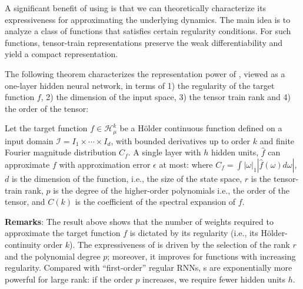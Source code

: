 %
A significant benefit of using \trnn{} is that we can theoretically characterize its expressiveness  for approximating the underlying dynamics.   The main idea is to analyze a class of functions that satisfies certain regularity conditions. For such functions, tensor-train representations preserve the weak differentiability and yield a compact representation.


The following theorem characterizes the representation power of \trnn{}, viewed as a one-layer hidden neural network, in terms of 1) the regularity of the target function $f$, 2) the dimension of the input space, 3) the tensor train rank and 4) the order of the tensor:
%
\begin{theorem}
Let the target function $f\in \mathcal{H}^k_\mu$ be a H\"older continuous function defined on a input  domain $\mathcal{I} =I_1\times \cdots \times I_d$, with  bounded derivatives up to order $k$ and finite Fourier magnitude distribution $C_f$. A single layer \trnn{} with $h$ hidden units, $\hat{f}$ can approximate $f$ with approximation error $\epsilon$ at most:
%
%
where $C_f = \int |\omega|_1 |\hat{f}(\omega) d \omega|$, $d$ is the dimension of the function, i.e., the size of the state space, $r$ is the tensor-train rank, $p$ is the degree of the higher-order polynomials i.e., the order of the tensor, and $C(k)$ is the coefficient of the spectral expansion of $f$.
\label{eqn:thm}
\end{theorem}

\textbf{Remarks}: The result above shows that the number of weights required to approximate the target function $f$ is dictated by its regularity (i.e., its H\"older-continuity order $k$). The expressiveness of \trnn{} is driven by the selection of the rank $r$ and the polynomial degree $p$; moreover, it improves for functions with increasing regularity.  Compared with ``first-order'' regular RNNs, \trnn{}s are  exponentially more powerful for large rank: if the order  $p$ increases, we require fewer hidden units $h$. 
% 
%

